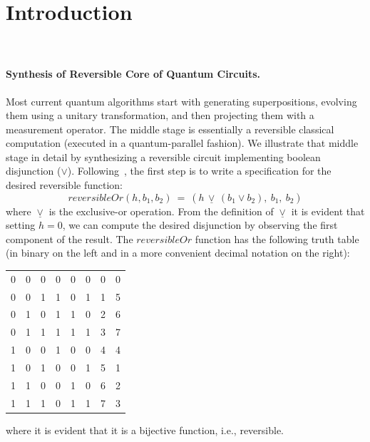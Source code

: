 \section{Introduction}~\label{sec:introduction}

\paragraph*{Synthesis of Reversible Core of Quantum Circuits.} Most current quantum algorithms start with generating superpositions, evolving them using a unitary transformation, and then projecting them with a measurement operator. The middle stage is essentially a reversible classical computation (executed in a quantum-parallel fashion). We illustrate that middle stage in detail by synthesizing a reversible circuit implementing boolean disjunction ($\vee$). Following~\citet{Toffoli:1980}, the first step is to write a specification for the desired reversible function:
\[
\mathit{reversibleOr}(h,b_1,b_2) ~=~ (h \,\underline{\vee}\, (b_1 \vee b_2), ~b_1, ~b_2)
\]
where $\underline{\vee}$ is the exclusive-or operation. From the definition of $\underline{\vee}$ it is evident that setting $h=0$, we can compute the desired disjunction by observing the first component of the result. The $\mathit{reversibleOr}$ function has the following truth table (in binary on the left and in a more convenient decimal notation on the right):

\begin{center}\begin{tabular}{|ccc|ccc|@{\qquad\qquad}|c|c|}
0 & 0 & 0 &     0 & 0 & 0     & 0 & 0 \\
0 & 0 & 1 &     1 & 0 & 1     & 1 & 5 \\
0 & 1 & 0 &     1 & 1 & 0    & 2 & 6 \\
0 & 1 & 1 &     1 & 1 & 1    & 3 & 7 \\
1 & 0 & 0 &     1 & 0 & 0    & 4 & 4 \\
1 & 0 & 1 &     0 & 0 & 1    & 5 & 1 \\
1 & 1 & 0 &     0 & 1 & 0    & 6 & 2 \\
1 & 1 & 1 &     0 & 1 & 1    & 7 & 3
\end{tabular}\end{center}

\noindent where it is evident that it is a bijective function, i.e., reversible.


